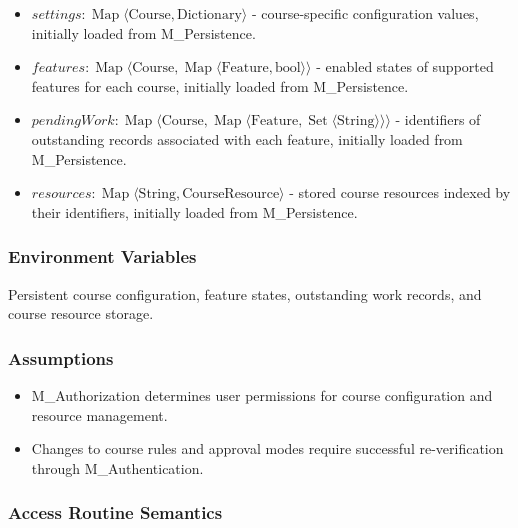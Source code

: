 \documentclass[12pt, titlepage]{article}
\begin{document}
\begin{itemize}
    \item $\mathit{settings}:
    \operatorname{Map}\langle
    \text{Course},\text{Dictionary}\rangle$
    - course-specific configuration values, initially
    loaded from M\_Persistence.

    \item $\mathit{features}:
    \operatorname{Map}\langle
    \text{Course},
    \operatorname{Map}\langle\text{Feature},\text{bool}\rangle
    \rangle$
    - enabled states of supported features for each
    course, initially loaded from M\_Persistence.

    \item $\mathit{pendingWork}:
    \operatorname{Map}\langle
    \text{Course},
    \operatorname{Map}\langle
            \text{Feature},\operatorname{Set}\langle\text{String}\rangle
    \rangle\rangle$
    - identifiers of outstanding records associated
    with each feature, initially loaded from
    M\_Persistence.

    \item $\mathit{resources}:
    \operatorname{Map}\langle
    \text{String},\text{CourseResource}\rangle$
    - stored course resources indexed by their
    identifiers, initially loaded from M\_Persistence.
\end{itemize}

\subsubsection{Environment Variables}

Persistent course configuration, feature states,
outstanding work records, and course resource storage.

\subsubsection{Assumptions}

\begin{itemize}
    \item M\_Authorization determines user permissions for course configuration and resource management.
    \item Changes to course rules and approval modes require successful re-verification through M\_Authentication.
\end{itemize}

\subsubsection{Access Routine Semantics}
\end{document}
